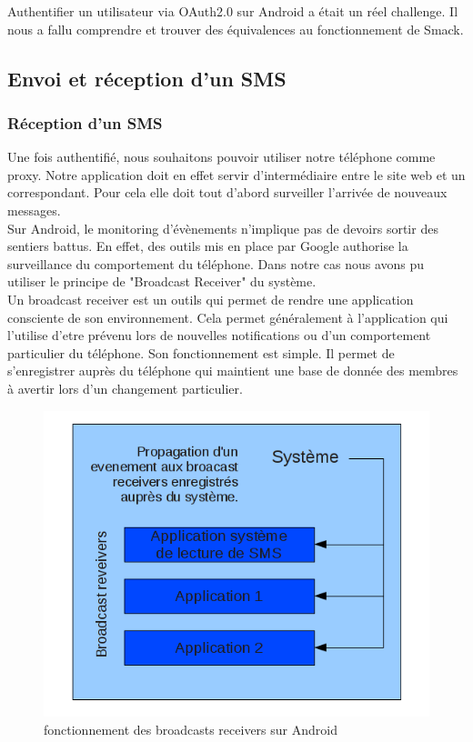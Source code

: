 Authentifier un utilisateur via OAuth2.0 sur Android a était un réel challenge. Il nous a fallu comprendre 
et trouver des équivalences au fonctionnement de Smack. 



\subsection{Envoi et réception d'un SMS}



\subsubsection{Réception d'un SMS}

Une fois authentifié, nous souhaitons pouvoir utiliser notre téléphone comme proxy. Notre application
doit en effet servir d'intermédiaire entre le site web et un correspondant. Pour cela elle doit tout
d'abord surveiller l'arrivée de nouveaux messages. 
\\
Sur Android, le monitoring d'évènements n'implique pas de devoirs sortir des sentiers battus. En effet,
des outils mis en place par Google authorise la surveillance du comportement du téléphone. Dans notre cas 
nous avons pu utiliser le principe de "Broadcast Receiver" du système. 
\\
Un broadcast receiver est un outils qui permet de rendre une application consciente de son environnement.
Cela permet généralement à l'application qui l'utilise d'etre prévenu lors de nouvelles notifications ou 
d'un comportement particulier du téléphone.
Son fonctionnement est simple. Il permet de s'enregistrer auprès du téléphone qui maintient une base de donnée des 
membres à avertir lors d'un changement particulier.

\begin{figure}[!h]
	\center
	\includegraphics[width=12cm]{img/broadcast-receivers.png}
	\caption{fonctionnement des broadcasts receivers sur Android}
\end{figure}

